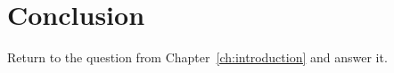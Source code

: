 \chapter{Conclusion}
\label{ch:conclusion}

Return to the question from Chapter~\ref{ch:introduction} and answer it.
